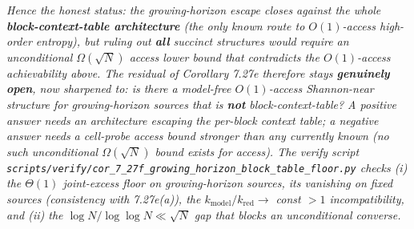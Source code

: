 \documentclass[
]{article}
\begin{document}
\emph{Hence the honest status: the growing-horizon escape closes against
the whole \textbf{block-context-table architecture} (the only known route
to $O(1)$-access high-order entropy), but ruling out \textbf{all} succinct
structures would require an unconditional $\Omega(\sqrt N)$ access lower
bound that contradicts the $O(1)$-access achievability above. The residual
of Corollary 7.27e therefore stays \textbf{genuinely open}, now sharpened
to: \emph{is there a model-free $O(1)$-access Shannon-near structure for
growing-horizon sources that is \textbf{not} block-context-table?} A
positive answer needs an architecture escaping the per-block context
table; a negative answer needs a cell-probe access bound stronger than
any currently known (no such unconditional $\Omega(\sqrt N)$ bound exists
for access). The verify script
\texttt{scripts/verify/cor\_7\_27f\_growing\_horizon\_block\_table\_floor.py}
checks (i) the $\Theta(1)$ joint-excess floor on growing-horizon sources,
its vanishing on fixed sources (consistency with 7.27e(a)), the
$k_{\mathrm{model}}/k_{\mathrm{red}} \to$ const $>1$ incompatibility, and
(ii) the $\log N/\log\log N \ll \sqrt N$ gap that blocks an unconditional
converse.}
\end{document}
